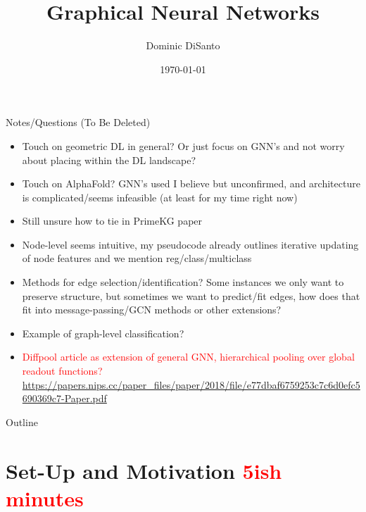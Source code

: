 \documentclass{beamer}
\title{Graphical Neural Networks}
\author{Dominic DiSanto}
\institute[]{Department of Biostatistics, Harvard University}
\date{\today}
\begin{document}
\begin{frame}[allowframebreaks]{Notes/Questions (To Be Deleted)}
    \begin{itemize}
        \item Touch on geometric DL in general? Or just focus on GNN's and not worry about placing within the DL landscape? 
        \item Touch on AlphaFold? GNN's used I believe but unconfirmed, and architecture is complicated/seems infeasible (at least for my time right now)
        \item Still unsure how to tie in PrimeKG paper
        \item Node-level seems intuitive, my pseudocode already outlines iterative updating of node features and we mention reg/class/multiclass
        \item Methods for edge selection/identification? Some instances we only want to preserve structure, but sometimes we want to predict/fit edges, how does that fit into message-passing/GCN methods or other extensions? 
        \item Example of graph-level classification?  
        \item \textcolor{red}{Diffpool article as extension of general GNN, hierarchical pooling over global readout functions?} \url{https://papers.nips.cc/paper_files/paper/2018/file/e77dbaf6759253c7c6d0efc5690369c7-Paper.pdf}
    \end{itemize}
\end{frame}


\begin{frame}
\maketitle
\end{frame}

\begin{frame}{Outline}
\tableofcontents 
\end{frame}


\section{Set-Up and Motivation \textcolor{red}{5ish minutes}}
\end{document}

